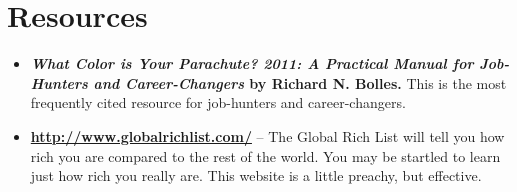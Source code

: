 \newpage
\section{Resources}
\begin{itemize}
\item \textbf{\emph{What Color is Your Parachute? 2011: A Practical Manual for Job-Hunters and Career-Changers} by Richard N. Bolles.} This is the most frequently cited resource for job-hunters and career-changers.

\item \textbf{\url{http://www.globalrichlist.com/}} -- The Global Rich List will tell you how rich you are compared to the rest of the world. You may be startled to learn just how rich you really are. This website is a little preachy, but effective.
\end{itemize}
